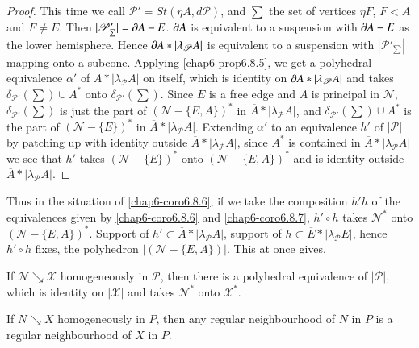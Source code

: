 \begin{proof}
This time we call $\mathscr{P}'=St(\eta A,d\mathscr{P})$, and $\sum$ the set of vertices $\eta F$, $F<A$ and $F\neq E$. Then $|\mathscr{P}'_{\sum}|=\partial A-E$. $\partial A$ is equivalent to a suspension with $\partial A-E$ as the lower hemisphere. Hence\pageoriginale 
$\partial A\ast |\lambda_{\mathscr{P}}A|$ is equivalent to a suspension with $|\mathscr{P}'_{\sum}|$ mapping onto a subcone. Applying \ref{chap6-prop6.8.5}, we get a polyhedral equivalence $\alpha'$ of $\overline{A}\ast |\lambda_{\mathscr{P}}A|$ on itself, which is identity on $\partial A\ast |\lambda_{\mathscr{P}}A|$ and takes $\delta_{\mathscr{P}'}(\sum)\cup A^{\ast}$ onto $\delta_{\mathscr{P}'}(\sum)$. Since $E$ is a free edge and $A$ is principal in $\mathscr{N}$, $\delta_{\mathscr{P}'}(\sum)$ is just the part of $(\mathscr{N}-\{E,A\})^{\ast}$ in $\overline{A}\ast |\lambda_{\mathscr{P}}A|$, and $\delta_{\mathscr{P}'}(\sum)\cup A^{\ast}$ is the part of $(\mathscr{N}-\{E\})^{\ast}$ in $\overline{A}\ast |\lambda_{\mathscr{P}}A|$. Extending $\alpha'$ to an equivalence $h'$ of $|\mathscr{P}|$ by patching up with identity outside $\overline{A}\ast |\lambda_{\mathscr{P}}A|$, since $A^{\ast}$ is contained in $\overline{A}\ast|\lambda_{\mathscr{P}}A|$ we see that $h'$ takes $(\mathscr{N}-\{E\})^{\ast}$ onto $(\mathscr{N}-\{E,A\})^{\ast}$ and is identity outside $\overline{A}\ast|\lambda_{\mathscr{P}}A|$.
\end{proof}

Thus in the situation of \ref{chap6-coro6.8.6}, if we take the composition $h'h$ of the equivalences given by \ref{chap6-coro6.8.6} and \ref{chap6-coro6.8.7}, $h'\circ h$ takes $\mathscr{N}^{\ast}$ onto $(\mathscr{N}-\{E,A\})^{\ast}$. Support of $h'\subset \overline{A}\ast |\lambda_{\mathscr{P}}A|$, support of $h\subset\overline{E}\ast|\lambda_{\mathscr{P}}E|$, hence $h'\circ h$ fixes, the polyhedron $|(\mathscr{N}-\{E,A\})|$. This at once gives,

\begin{proposition}\label{chap6-prop6.8.8}
If $\mathscr{N}\searrow \mathscr{X}$ homogeneously in $\mathscr{P}$, then there is a polyhedral equivalence of $|\mathscr{P}|$, which is identity on $|\mathscr{X}|$ and takes $\mathscr{N}^{\ast}$ onto $\mathscr{X}^{\ast}$.
\end{proposition}

\begin{corollary}\label{chap6-coro6.8.9}
If $N\searrow X$ homogeneously in $P$, then any regular neighbourhood of $N$ in $P$ is a regular neighbourhood of $X$ in $P$.
\end{corollary}


